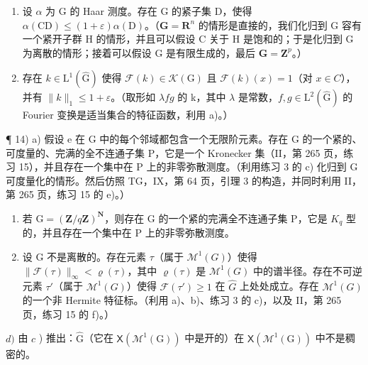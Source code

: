 \begin{enumerate}
\def\labelenumi{\alph{enumi})}
\item
  设 \(\alpha\) 为 G 的 Haar 测度。存在 G 的紧子集 D，使得 \(\alpha(\mathrm{CD}) \leqslant (1 + \varepsilon)\alpha(\mathrm{D})\)。（\(\mathbf{G} = \mathbf{R}^n\) 的情形是直接的，我们化归到 G 容有一个紧开子群 H 的情形，并且可以假设 C 关于 H 是饱和的；于是化归到 G 为离散的情形；接着可以假设 G 是有限生成的，最后 \(\mathbf{G} = \mathbf{Z}^p\)。）
\item
  存在 \(k \in \mathrm{L}^{1}(\widehat{\mathrm{G}})\) 使得 \(\mathcal{F}(k) \in \mathcal{K}(\mathrm{G})\) 且 \(\mathcal{F}(k)(x) = 1\)（对 \(x \in C\)），并有 \(\|k\|_{1} \leqslant 1 + \varepsilon\)。（取形如 \(\lambda fg\) 的 k，其中 \(\lambda\) 是常数，\(f, g \in \mathrm{L}^{2}(\widehat{\mathrm{G}})\) 的 Fourier 变换是适当集合的特征函数，利用 a)。）
\end{enumerate}

¶ 14) a) 假设 e 在 G 中的每个邻域都包含一个无限阶元素。存在 G 的一个紧的、可度量的、完满的全不连通子集 P，它是一个 Kronecker 集（II，第 265 页，练习 15），并且存在一个集中在 P 上的非零弥散测度。（利用练习 3 的 c) 化归到 G 可度量化的情形。然后仿照 TG，IX，第 64 页，引理 3 的构造，并同时利用 II，第 265 页，练习 15 的 e)。）

\begin{enumerate}
\def\labelenumi{\alph{enumi})}
\setcounter{enumi}{1}
\item
  若 \(\mathrm{G} = (\mathbf{Z}/q\mathbf{Z})^{\mathbf{N}}\)，则存在 G 的一个紧的完满全不连通子集 P，它是 \(K_{q}\) 型的，并且存在一个集中在 P 上的非零弥散测度。
\item
  设 G 不是离散的。存在元素 \(\tau\)（属于 \(\mathcal{M}^{1}(G)\)）使得 \(\|\mathcal{F}(\tau)\|_{\infty}<\varrho(\tau)\)，其中 \(\varrho(\tau)\) 是 \(\mathcal{M}^{1}(G)\) 中的谱半径。存在不可逆元素 \(\tau'\)（属于 \(\mathcal{M}^{1}(G)\)）使得 \(\mathcal{F}(\tau')\geqslant1\) 在 \(\widehat{G}\) 上处处成立。存在 \(\mathcal{M}^{1}(G)\) 的一个非 Hermite 特征标。（利用 a)、b)、练习 3 的 c)，以及 II，第 265 页，练习 15 的 f)。）
\end{enumerate}

\(d)\) 由 \(c\) ) 推出：\(\widehat{\mathrm{G}}\)（它在 \(\mathsf{X}(\mathcal{M}^1 (\mathrm{G}))\) 中是开的）在 \(\mathsf{X}(\mathcal{M}^1 (\mathrm{G}))\) 中不是稠密的。

